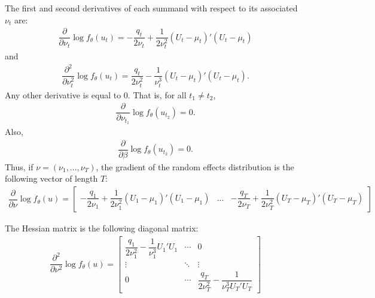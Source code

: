\documentclass{article}
\begin{document}

The first and second derivatives of each summand with respect to its associated $\nu_t$ are:
\begin{align}
\dfrac{\partial}{\partial \nu_t} \log f_\theta(u_t) = - \dfrac{q_t}{2 \nu_t} + \dfrac{1}{2 \nu_t^2}(U_t-\mu_t)'(U_t-\mu_t)
\end{align}
and 
\begin{align}
\dfrac{\partial^2}{\partial \nu_t^2} \log f_\theta(u_t) = \dfrac{q_t}{2 \nu_t^2}- \dfrac{1}{\nu_t^3} (U_t-\mu_t)'(U_t-\mu_t).
\end{align}
Any other derivative is equal to 0. That is, for all $t_1 \neq t_2$,
\begin{align}
\dfrac{\partial}{\partial \nu_{t_1}} \log f_\theta(u_{t_2}) = 0.
\end{align}
Also,
\begin{align}
\dfrac{\partial}{\partial \beta} \log f_\theta(u_{t_2}) = 0.
\end{align}
Thus, if $\nu = (\nu_1,...,\nu_T)$, the gradient of the random effects distribution is the following vector of length $T$:
\begin{align}
\dfrac{\partial}{\partial \nu}  \log f_\theta(u) = \begin{bmatrix} - \dfrac{q_1}{2 \nu_1} + \dfrac{1}{2 \nu_1^2} (U_1-\mu_1) ' (U_1-\mu_1) & ... & - \dfrac{q_T}{2 \nu_T} + \dfrac{1}{2 \nu_T^2} (U_T-\mu_T) '(U_T-\mu_T)   \end{bmatrix} 
\end{align}

The Hessian matrix is the following diagonal matrix:
\begin{align}
\dfrac{\partial^2}{\partial \nu^2} \log f_\theta(u) = \begin{bmatrix} \dfrac{q_1}{2 \nu_1^2}- \dfrac{1}{\nu_1^3} U_1'U_1 & \cdots & 0 \\ \vdots & \ddots & \vdots \\ 0 & \cdots & \dfrac{q_T}{2 \nu_T^2}- \dfrac{1}{\nu_T^3 U_T'U_T} \end{bmatrix}
\end{align}
\end{document}
